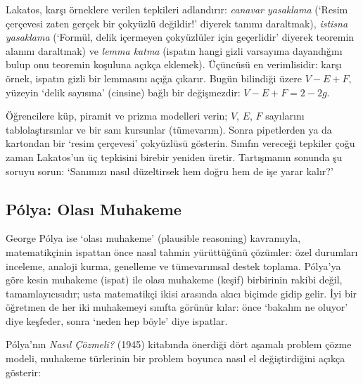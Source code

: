Lakatos, karşı örneklere verilen tepkileri adlandırır: \emph{canavar yasaklama} (‘Resim çerçevesi zaten gerçek bir çokyüzlü değildir!’ diyerek tanımı daraltmak), \emph{istisna yasaklama} (‘Formül, delik içermeyen çokyüzlüler için geçerlidir’ diyerek teoremin alanını daraltmak) ve \emph{lemma katma} (ispatın hangi gizli varsayıma dayandığını bulup onu teoremin koşuluna açıkça eklemek). Üçüncüsü en verimlisidir: karşı örnek, ispatın gizli bir lemmasını açığa çıkarır. Bugün bilindiği üzere $V-E+F$, yüzeyin ‘delik sayısına’ (cinsine) bağlı bir değişmezdir: $V-E+F=2-2g$.

\begin{sinif}
Öğrencilere küp, piramit ve prizma modelleri verin; $V$, $E$, $F$ sayılarını tablolaştırsınlar ve bir sanı kursunlar (tümevarım). Sonra pipetlerden ya da kartondan bir ‘resim çerçevesi’ çokyüzlüsü gösterin. Sınıfın vereceği tepkiler çoğu zaman Lakatos’un üç tepkisini birebir yeniden üretir. Tartışmanın sonunda şu soruyu sorun: ‘Sanımızı nasıl düzeltirsek hem doğru hem de işe yarar kalır?’
\end{sinif}

\subsection{Pólya: Olası Muhakeme}

George Pólya ise ‘olası muhakeme’ (plausible reasoning) kavramıyla, matematikçinin ispattan önce nasıl tahmin yürüttüğünü çözümler: özel durumları inceleme, analoji kurma, genelleme ve tümevarımsal destek toplama. Pólya’ya göre kesin muhakeme (ispat) ile olası muhakeme (keşif) birbirinin rakibi değil, tamamlayıcısıdır; usta matematikçi ikisi arasında akıcı biçimde gidip gelir. İyi bir öğretmen de her iki muhakemeyi sınıfta görünür kılar: önce ‘bakalım ne oluyor’ diye keşfeder, sonra ‘neden hep böyle’ diye ispatlar.

Pólya’nın \emph{Nasıl Çözmeli?} (1945) kitabında önerdiği dört aşamalı problem çözme modeli, muhakeme türlerinin bir problem boyunca nasıl el değiştirdiğini açıkça gösterir:


